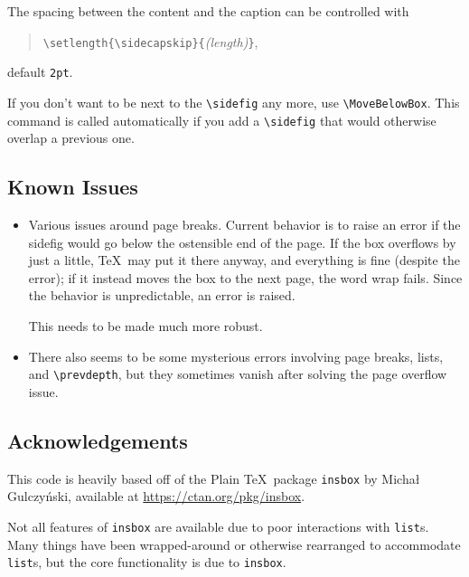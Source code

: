 \documentclass{article}
\begin{document}
	
	The spacing between the content and the caption can be controlled with
	\begin{quote}
		\verb|\setlength{\sidecapskip}{|\emph{(length)}\verb|}|,
	\end{quote}
	default \verb|2pt|.
	
	If you don't want to be next to the \verb|\sidefig| any more, use \verb|\MoveBelowBox|.
	This command is called automatically if you add a \verb|\sidefig| that would otherwise overlap a previous one.
	
	\subsection*{Known Issues}
	
	\begin{itemize}
		\item Various issues around page breaks.
		Current behavior is to raise an error if the sidefig would go below the ostensible end of the page.
		If the box overflows by just a little, \TeX\ may put it there anyway, and everything is fine (despite the error); if it instead moves the box to the next page, the word wrap fails.
		Since the behavior is unpredictable, an error is raised.
		
		This needs to be made much more robust.
		
		\item There also seems to be some mysterious errors involving page breaks, lists, and \verb|\prevdepth|, but they sometimes vanish after solving the page overflow issue.
	\end{itemize}
	
	\subsection*{Acknowledgements}
	
	This code is heavily based off of the Plain \TeX\ package \verb|insbox| by Micha\l{} Gulczy\'nski, available at \url{https://ctan.org/pkg/insbox}.
	
	Not all features of \verb|insbox| are available due to poor interactions with \verb|list|s.
	Many things have been wrapped-around or otherwise rearranged to accommodate \verb|list|s, but the core functionality is due to \verb|insbox|.
	
\end{document}
